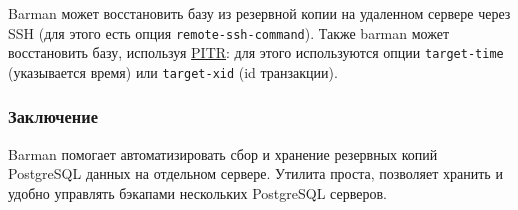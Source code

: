 Barman может восстановить базу из резервной копии на удаленном сервере через SSH (для этого есть опция \lstinline!remote-ssh-command!). Также barman может восстановить базу, используя \href{http://en.wikipedia.org/wiki/Point-in-time\_recovery}{PITR}: для этого используются опции \lstinline!target-time! (указывается время) или \lstinline!target-xid! (id транзакции).


\subsubsection{Заключение}

Barman помогает автоматизировать сбор и хранение резервных копий PostgreSQL данных на отдельном сервере. Утилита проста, позволяет хранить и удобно управлять бэкапами нескольких PostgreSQL серверов.
